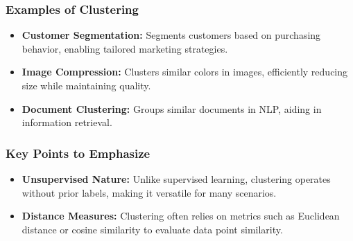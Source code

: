 \documentclass[aspectratio=169]{beamer}
\begin{document}
\begin{frame}[fragile]
    \frametitle{Examples of Clustering}
    \begin{itemize}
        \item \textbf{Customer Segmentation:} 
        Segments customers based on purchasing behavior, enabling tailored marketing strategies.
        \item \textbf{Image Compression:} 
        Clusters similar colors in images, efficiently reducing size while maintaining quality.
        \item \textbf{Document Clustering:} 
        Groups similar documents in NLP, aiding in information retrieval.
    \end{itemize}
\end{frame}

\begin{frame}[fragile]
    \frametitle{Key Points to Emphasize}
    \begin{itemize}
        \item \textbf{Unsupervised Nature:} 
        Unlike supervised learning, clustering operates without prior labels, making it versatile for many scenarios.
        \item \textbf{Distance Measures:} 
        Clustering often relies on metrics such as Euclidean distance or cosine similarity to evaluate data point similarity.
    \end{itemize}
\end{frame}
\end{document}
